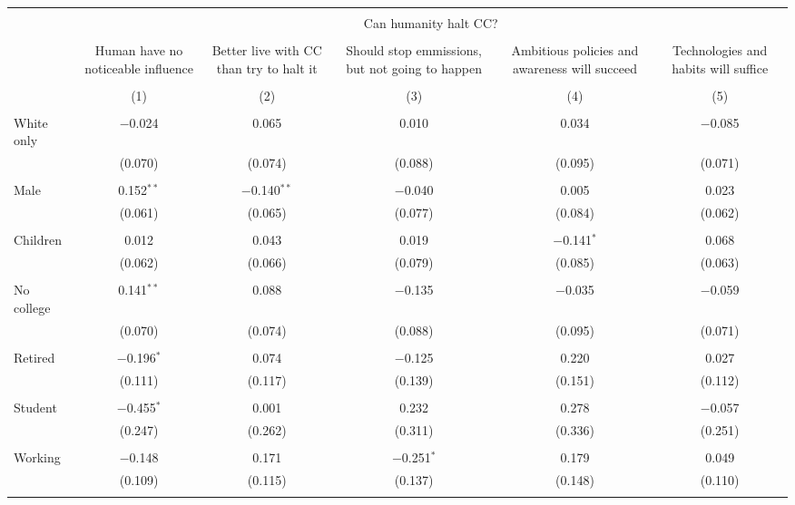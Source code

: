 
\begin{tabular}{@{\extracolsep{5pt}}lccccc} 
\\[-1.8ex]\hline 
\hline \\[-1.8ex] 
 & \multicolumn{5}{c}{Can humanity halt CC?} \\ 
\cline{2-6} 
\\[-1.8ex] & Human have no noticeable influence & Better live with CC than try to halt it & Should stop emmissions, but not going to happen & Ambitious policies and awareness will succeed & Technologies and habits will suffice \\ 
\\[-1.8ex] & (1) & (2) & (3) & (4) & (5)\\ 
\hline \\[-1.8ex] 
 White only & $-$0.024 & 0.065 & 0.010 & 0.034 & $-$0.085 \\ 
  & (0.070) & (0.074) & (0.088) & (0.095) & (0.071) \\ 
  & & & & & \\ 
 Male & 0.152$^{**}$ & $-$0.140$^{**}$ & $-$0.040 & 0.005 & 0.023 \\ 
  & (0.061) & (0.065) & (0.077) & (0.084) & (0.062) \\ 
  & & & & & \\ 
 Children & 0.012 & 0.043 & 0.019 & $-$0.141$^{*}$ & 0.068 \\ 
  & (0.062) & (0.066) & (0.079) & (0.085) & (0.063) \\ 
  & & & & & \\ 
 No college & 0.141$^{**}$ & 0.088 & $-$0.135 & $-$0.035 & $-$0.059 \\ 
  & (0.070) & (0.074) & (0.088) & (0.095) & (0.071) \\ 
  & & & & & \\ 
 Retired & $-$0.196$^{*}$ & 0.074 & $-$0.125 & 0.220 & 0.027 \\ 
  & (0.111) & (0.117) & (0.139) & (0.151) & (0.112) \\ 
  & & & & & \\ 
 Student & $-$0.455$^{*}$ & 0.001 & 0.232 & 0.278 & $-$0.057 \\ 
  & (0.247) & (0.262) & (0.311) & (0.336) & (0.251) \\ 
  & & & & & \\ 
 Working & $-$0.148 & 0.171 & $-$0.251$^{*}$ & 0.179 & 0.049 \\ 
  & (0.109) & (0.115) & (0.137) & (0.148) & (0.110) \\ 
  & & & & & \\ 

\end{tabular}
